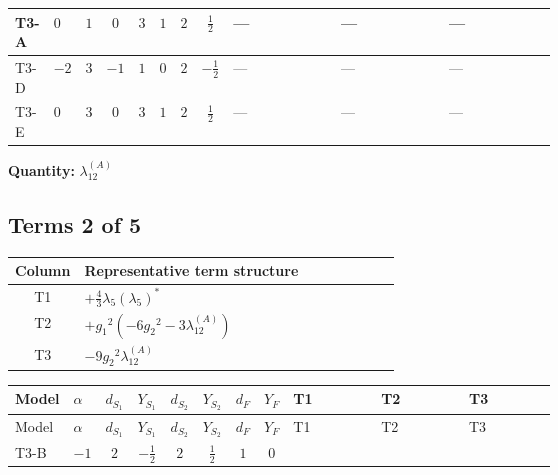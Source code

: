 \documentclass[8pt]{article}
\begin{document}
\begin{landscape}
\begin{longtable}{@{}llcccccc >{\raggedright\arraybackslash}p{0.21\linewidth} >{\raggedright\arraybackslash}p{0.21\linewidth} >{\raggedright\arraybackslash}p{0.21\linewidth}@{}}
\midrule
T3-A & $0$ & $1$ & $0$ & $3$ & $1$ & $2$ & $\frac{1}{2}$ & --- & --- & --- \\
\midrule
T3-D & $-2$ & $3$ & $-1$ & $1$ & $0$ & $2$ & $-\frac{1}{2}$ & --- & --- & --- \\
\midrule
T3-E & $0$ & $3$ & $0$ & $3$ & $1$ & $2$ & $\frac{1}{2}$ & --- & --- & --- \\
\midrule
\bottomrule
\end{longtable}
\clearpage
\noindent\textbf{Quantity: }$\lambda_{12}^{(A)}$\par\smallskip
\subsection*{Terms 2 of 5}
\begin{center}
\begin{tabular}{@{}c >{\raggedright\arraybackslash}p{0.82\linewidth}@{}}
\toprule
Column & Representative term structure \\
\midrule
T1 & \(\displaystyle +\frac{4}{3} {\lambda_5} \left({\lambda_5}\right)^{*}\) \\
\midrule
T2 & \(\displaystyle +{g_1}^2 \left(-6 {g_2}^2-3 {\lambda_{12}^{(A)}}\right)\) \\
\midrule
T3 & \(\displaystyle -9 {g_2}^2 {\lambda_{12}^{(A)}}\) \\
\midrule
\bottomrule
\end{tabular}
\end{center}
\smallskip
\tiny
\begin{longtable}{@{}llcccccc >{\raggedright\arraybackslash}p{0.21\linewidth} >{\raggedright\arraybackslash}p{0.21\linewidth} >{\raggedright\arraybackslash}p{0.21\linewidth}@{}}
\toprule
Model & $\alpha$ & $d_{S_1}$ & $Y_{S_1}$ & $d_{S_2}$ & $Y_{S_2}$ & $d_F$ & $Y_F$ & T1 & T2 & T3 \\
\midrule
\endfirsthead
\toprule
Model & $\alpha$ & $d_{S_1}$ & $Y_{S_1}$ & $d_{S_2}$ & $Y_{S_2}$ & $d_F$ & $Y_F$ & T1 & T2 & T3 \\
\midrule
\endhead
T3-B & $-1$ & $2$ & $-\frac{1}{2}$ & $2$ & $\frac{1}{2}$ & $1$ & $0$ & \scriptsize\adjustbox{max width=\linewidth}{$\begin{gathered} +\frac{4}{3} {\lambda_5} \left({\lambda_5}\right)^{*}\end{gathered}$} & \scriptsize\adjustbox{max width=\linewidth}{$\begin{gathered} +{g_1}^2 \left(-6 {g_2}^2-3 {\lambda_{12}^{(A)}}\right)\end{gathered}$} & \scriptsize\adjustbox{max width=\linewidth}{$\begin{gathered} -9 {g_2}^2 {\lambda_{12}^{(A)}}\end{gathered}$} \\

\end{longtable}
\end{landscape}
\end{document}
